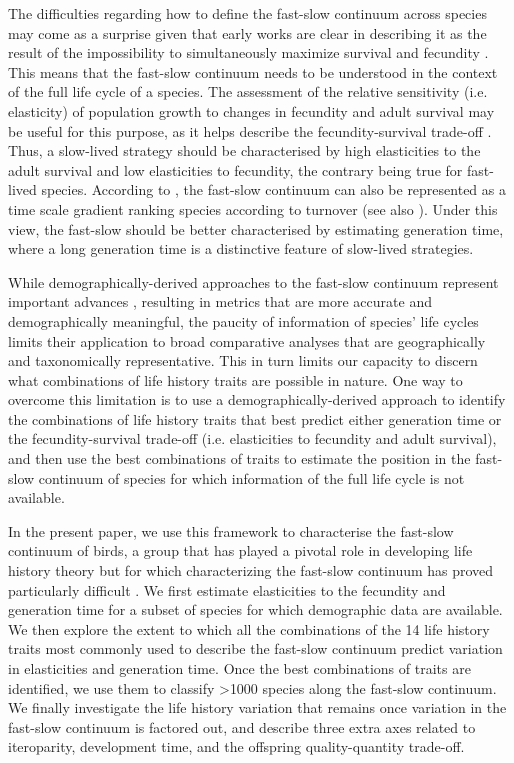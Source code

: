 The difficulties regarding how to define the fast-slow continuum across species
may come as a surprise given that early works are clear in describing it as the
result of the impossibility to simultaneously maximize survival and fecundity
\citep{Stearns1983a, Saether1988}. This means that the fast-slow continuum needs
to be understood in the context of the full life cycle of a species.
The assessment of the relative sensitivity (i.e. elasticity) of population
growth to changes in fecundity and adult survival may be useful for this
purpose, as it helps describe the fecundity-survival trade-off
\citep{Salguero-Gomez2016a}. Thus, a slow-lived strategy should be characterised
by high elasticities to the adult survival and low elasticities to fecundity,
the contrary being true for fast-lived species.
According to \citet{Gaillard1989}, the fast-slow continuum can also be 
represented as a time scale gradient ranking species according to turnover (see 
also \citet{Jeschke2009,Saether2013,Adler2014}⁠). Under this view, the
fast-slow should be better characterised by estimating generation time, where a 
long generation time is a distinctive feature of slow-lived strategies.

While demographically-derived approaches to the fast-slow continuum represent
important advances \citep{Salguero-Gomez2016a}, resulting in metrics that are
more accurate and demographically meaningful, the paucity of information of
species’ life cycles limits their application to broad comparative analyses
that are geographically and taxonomically representative. This in turn limits
our capacity to discern what combinations of life history traits are possible
in nature.
One way to overcome this limitation is to use a demographically-derived
approach to identify the combinations of life history traits that best predict
either generation time or the fecundity-survival trade-off (i.e. elasticities to
fecundity and adult survival), and then use the best combinations of traits to
estimate the position in the fast-slow continuum of species for which
information of the full life cycle is not available.

In the present paper, we use this framework to characterise the fast-slow
continuum of birds, a group that has played a pivotal role in developing life
history theory but for which characterizing the fast-slow continuum has proved
particularly difficult \citep{Martin2004}.
We first estimate elasticities to the fecundity and generation time for a
subset of species for which demographic data are available. We then explore the
extent to which all the combinations of the 14 life history traits most
commonly used to describe the fast-slow continuum  predict variation in
elasticities and generation time. Once the best  combinations of traits are
identified, we use them to classify \textgreater{1000} species along the
fast-slow continuum.
We finally investigate the life history variation that remains once variation
in the fast-slow continuum is factored out, and describe three extra axes
related to iteroparity, development time, and the offspring quality-quantity
trade-off.


